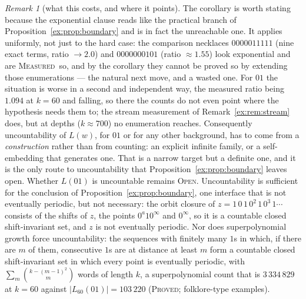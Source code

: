 \documentclass[11pt]{article}
\theoremstyle{definition}
\theoremstyle{remark}
\newtheorem{remark}[theorem]{Remark}
\newcommand{\PROVED}{\textsc{Proved}}
\newcommand{\MEASURED}{\textsc{Measured}}
\newcommand{\OPEN}{\textsc{Open}}
\begin{document}
\begin{remark}[what this costs, and where it points]\label{ex:rem:infimum}
The corollary is worth stating because the exponential clause reads like the practical branch of
Proposition~\ref{ex:prop:boundary} and is in fact the unreachable one. It applies uniformly, not just
to the hard case: the comparison necklaces $0000011111$ (nine exact terms, ratio $\to2.0$) and
$0000000101$ (ratio $\approx1.55$) look exponential and are \MEASURED\ so, and by the corollary they
cannot be proved so by extending those enumerations --- the natural next move, and a wasted one. For
$01$ the situation is worse in a second and independent way, the measured ratio being $1.094$ at $k=60$ and
falling, so there the counts do not even point where the hypothesis needs them to; the stream measurement of Remark~\ref{ex:rem:stream} does, but at depths ($k\approx700$) no enumeration reaches.
Consequently uncountability of $L(w)$, for $01$ or for any other background, has to come from a
\emph{construction} rather than from counting: an explicit infinite family, or a self-embedding that
generates one. That is a narrow target but a definite one, and it is the only route to
uncountability that Proposition~\ref{ex:prop:boundary} leaves open. Whether $L(01)$ is uncountable remains \OPEN.
Uncountability is sufficient for the conclusion of Proposition~\ref{ex:prop:boundary}, one interface that
is not eventually periodic, but not necessary: the orbit closure of $z=1\,0\,1\,0^2\,1\,0^3\,1\cdots$
consists of the shifts of $z$, the points $0^a10^{\infty}$ and $0^{\infty}$, so it is a countable closed
shift-invariant set, and $z$ is not eventually periodic. Nor does superpolynomial growth force uncountability: the sequences with
finitely many $1$s in which, if there are $m$ of them, consecutive $1$s are at distance at least $m$ form a
countable closed shift-invariant set in which every point is eventually periodic, with
$\sum_m\binom{k-(m-1)^2}{m}$ words of length $k$, a superpolynomial count that is $3\,334\,829$ at $k=60$ against
$|L_{60}(01)|=103\,220$ (\PROVED; folklore-type examples).
\end{remark}
\end{document}
